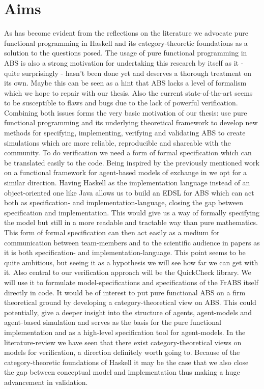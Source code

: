 \section{Aims}
As has become evident from the reflections on the literature we advocate pure functional programming in Haskell and its category-theoretic foundations as a solution to the questions posed. The usage of pure functional programming in ABS is also a strong motivation for undertaking this research by itself as it - quite surprisingly - hasn't been done yet and deserves a thorough treatment on its own. Maybe this can be seen as a hint that ABS lacks a level of formalism which we hope to repair with our thesis. Also the current state-of-the-art seems to be susceptible to flaws and bugs due to the lack of powerful verification. Combining both issues forms the very basic motivation of our thesis: use pure functional programming and its underlying theoretical framework to develop new methods for specifying, implementing, verifying and validating ABS to create simulations which are more reliable, reproducible and shareable with the community.
To do verification we need a form of formal specification which can be translated easily to the code. Being inspired by the previously mentioned work on a functional framework for agent-based models of exchange in \cite{botta_functional_2011} we opt for a similar direction. Having Haskell as the implementation language instead of an object-oriented one like Java allows us to build an EDSL for ABS which can act both as specification- and implementation-language, closing the gap between specification and implementation. This would give us a way of formally specifying the model but still in a more readable and tractable way than pure mathematics. This form of formal specification can then act easily as a medium for communication between team-members and to the scientific audience in papers as it is both specification- and implementation-language. This point seems to be quite ambitious, but seeing it as a hypothesis we will see how far we can get with it. Also central to our verification approach will be the QuickCheck library. We will use it to formulate model-specifications and specifications of the FrABS itself directly in code. 
It would be of interest to put pure functional ABS on a firm theoretical ground by developing a category-theoretical view on ABS. This could potentially, give a deeper insight into the structure of agents, agent-models and agent-based simulation and serves as the basis for the pure functional implementation and as a high-level specification tool for agent-models. In the literature-review we have seen that there exist category-theoretical views on models for verification, a direction definitely worth going to. Because of the category-theoretic foundations of Haskell it may be the case that we also close the gap between conceptual model and implementation thus making a huge advancement in validation.
